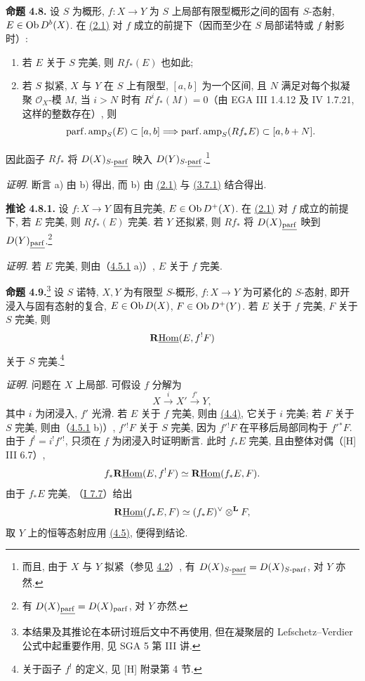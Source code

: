 \textbf{命题 4.8.} 设 \(S\) 为概形, \(f:X\to Y\) 为 $S$ 上局部有限型概形之间的固有 \(S\)-态射, \(E\in\operatorname{Ob} D^b(X)\). 在 \hyperlink{sga6.e03.conj.2-1}{(2.1)} 对 \(f\) 成立的前提下（因而至少在 \(S\) 局部诺特或 \(f\) 射影时）:
\begin{enumerate}[label=\alph*)]
\item 若 \(E\) 关于 \(S\) 完美, 则 \(Rf_*(E)\) 也如此;
\item 若 \(S\) 拟紧, \(X\) 与 \(Y\) 在 \(S\) 上有限型, \([a,b]\) 为一个区间, 且 \(N\) 满足对每个拟凝聚 \(\mathcal O_X\)-模 \(M\), 当 \(i>N\) 时有 \(R^if_*(M)=0\)（由 EGA III 1.4.12 及 IV 1.7.21, 这样的整数存在）, 则
\[
 \operatorname{parf.amp}_S(E)\subset[a,b]
 \Longrightarrow
 \operatorname{parf.amp}_S(Rf_*E)
 \subset[a,b+N].
\]
\end{enumerate}
因此函子 \(Rf_*\) 将 \(D(X)_{S\text{-}\underline{\mathrm{parf}}}\) 映入 \(D(Y)_{S\text{-}\underline{\mathrm{parf}}}\).\footnote{而且, 由于 \(X\) 与 \(Y\) 拟紧（参见 \hyperlink{sga6.e03.notation.4-2}{4.2}）, 有 \(D(X)_{S\text{-}\underline{\mathrm{parf}}}=D(X)_{S\text{-}\mathrm{parf}}\), 对 \(Y\) 亦然.}

\emph{证明.} 断言 a) 由 b) 得出, 而 b) 由 \hyperlink{sga6.e03.conj.2-1}{(2.1)} 与 \hyperlink{sga6.e03.cor.3-7-1}{(3.7.1)} 结合得出.

\textbf{推论 4.8.1.} 设 \(f:X\to Y\) 固有且完美, \(E\in\operatorname{Ob} D^{+}(X)\). 在 \hyperlink{sga6.e03.conj.2-1}{(2.1)} 对 \(f\) 成立的前提下, 若 \(E\) 完美, 则 \(Rf_*(E)\) 完美. 若 \(Y\) 还拟紧, 则 \(Rf_*\) 将 \(D(X)_{\underline{\mathrm{parf}}}\) 映到 \(D(Y)_{\underline{\mathrm{parf}}}\).\footnote{有 \(D(X)_{\underline{\mathrm{parf}}}=D(X)_{\mathrm{parf}}\), 对 \(Y\) 亦然.}

\emph{证明.} 若 \(E\) 完美, 则由（\hyperlink{sga6.e03.cor.4-5-1}{4.5.1} a)）, \(E\) 关于 \(f\) 完美.

\textbf{命题 4.9.}\footnote{本结果及其推论在本研讨班后文中不再使用, 但在凝聚层的 Lefschetz--Verdier 公式中起重要作用, 见 SGA 5 第 III 讲.} 设 \(S\) 诺特, \(X,Y\) 为有限型 \(S\)-概形, \(f:X\to Y\) 为可紧化的 \(S\)-态射, 即开浸入与固有态射的复合, \(E\in\operatorname{Ob} D(X)\), \(F\in\operatorname{Ob} D^{+}(Y)\). 若 \(E\) 关于 \(f\) 完美, \(F\) 关于 \(S\) 完美, 则
\[
 \mathbf R\underline{\operatorname{Hom}}(E,f^!F)
\]
关于 \(S\) 完美.\footnote{关于函子 \(f^!\) 的定义, 见 [H] 附录第 4 节.}

\emph{证明.} 问题在 \(X\) 上局部. 可假设 \(f\) 分解为
\[
 X\xrightarrow{i}X'\xrightarrow{f'}Y,
\]
其中 \(i\) 为闭浸入, \(f'\) 光滑. 若 \(E\) 关于 \(f\) 完美, 则由 \hyperlink{sga6.e03.prop.4-4}{(4.4)}, 它关于 \(i\) 完美; 若 \(F\) 关于 \(S\) 完美, 则由（\hyperlink{sga6.e03.cor.4-5-1}{4.5.1} b)）, \(f'{}^!F\) 关于 \(S\) 完美, 因为 \(f'{}^!F\) 在平移后局部同构于 \(f'{}^*F\). 由于 \(f^!=i^!f'{}^!\), 只须在 \(f\) 为闭浸入时证明断言. 此时 \(f_*E\) 完美, 且由整体对偶（[H] III 6.7）,
\[
 f_*\mathbf R\underline{\operatorname{Hom}}(E,f^!F)\simeq\mathbf R\underline{\operatorname{Hom}}(f_*E,F).
\]
由于 \(f_*E\) 完美, （\hyperlink{sga6.e01.cor.7-7}{I 7.7}）给出
\[
 \mathbf R\underline{\operatorname{Hom}}(f_*E,F)\simeq(f_*E)^{\vee}\otimes^{\mathbf L}F,
\]
取 \(Y\) 上的恒等态射应用 \hyperlink{sga6.e03.prop.4-5}{(4.5)}, 便得到结论.

